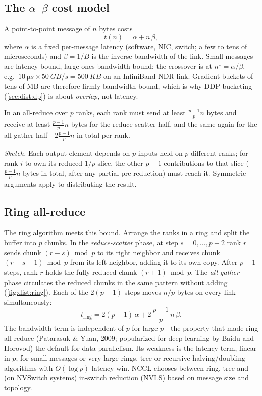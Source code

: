\subsection{The $\alpha$--$\beta$ cost model}
A point-to-point message of $n$ bytes costs
\begin{equation}
t(n) = \alpha + n\,\beta,
\end{equation}
where $\alpha$ is a fixed per-message latency (software, NIC, switch; a few to tens of
microseconds) and $\beta=1/B$ is the inverse bandwidth of the link. Small messages are
latency-bound, large ones bandwidth-bound; the crossover is at $n^\star=\alpha/\beta$, e.g.\
$\SI{10}{\micro s}\times\SI{50}{GB/s}=\SI{500}{KB}$ on an InfiniBand NDR link. Gradient
buckets of tens of MB are therefore firmly bandwidth-bound, which is why DDP bucketing
(\cref{sec:dist:dp}) is about \emph{overlap}, not latency.

\begin{proposition}
In an all-reduce over $p$ ranks, each rank must send at least $\frac{p-1}{p}n$ bytes and receive
at least $\frac{p-1}{p}n$ bytes for the reduce-scatter half, and the same again for the
all-gather half---$2\frac{p-1}{p}n$ in total per rank.
\end{proposition}
\emph{Sketch.} Each output element depends on $p$ inputs held on $p$ different ranks; for
rank $i$ to own its reduced $1/p$ slice, the other $p-1$ contributions to that slice
($\frac{p-1}{p}n$ bytes in total, after any partial pre-reduction) must reach it. Symmetric
arguments apply to distributing the result.

\subsection{Ring all-reduce}\label{sec:dist:ring}
The ring algorithm meets this bound. Arrange the ranks in a ring and split the buffer into $p$
chunks. In the \emph{reduce-scatter} phase, at step $s=0,\dots,p-2$ rank $r$ sends chunk
$(r-s)\bmod p$ to its right neighbor and receives chunk $(r-s-1)\bmod p$ from its left
neighbor, adding it to its own copy. After $p-1$ steps, rank $r$ holds the fully reduced chunk
$(r+1)\bmod p$. The \emph{all-gather} phase circulates the reduced chunks in the same pattern
without adding (\cref{fig:dist:ring}). Each of the $2(p-1)$ steps moves $n/p$ bytes on every
link simultaneously:
\begin{equation}
t_{\text{ring}} = 2(p-1)\,\alpha + 2\,\frac{p-1}{p}\,n\,\beta.
\label{eq:dist:ring}
\end{equation}
The bandwidth term is independent of $p$ for large $p$---the property that made ring
all-reduce (Patarasuk \& Yuan, 2009; popularized for deep learning by Baidu and Horovod)
the default for data parallelism. Its weakness is the latency term, linear in $p$; for small
messages or very large rings, tree or recursive halving/doubling algorithms with $O(\log p)$
latency win. NCCL chooses between ring, tree and (on NVSwitch systems) in-switch reduction
(NVLS) based on message size and topology.

